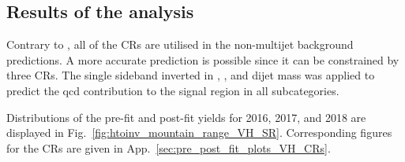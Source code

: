 

\subsection{Results of the \texorpdfstring{\VH}{VH} analysis}
\label{subsec:htoinv_analysis_VH}

Contrary to \ttH, all of the \glspl{CR} are utilised in the non-multijet background predictions. A more accurate \ztonunu prediction is possible since it can be constrained by three \glspl{CR}. The single sideband inverted in \mindphi, \omegaTilde, and dijet mass was applied to predict the \acrshort{qcd} contribution to the signal region in all \VH subcategories.

Distributions of the pre-fit and post-fit yields for 2016, 2017, and 2018 are displayed in Fig.~\ref{fig:htoinv_mountain_range_VH_SR}. Corresponding figures for the \glspl{CR} are given in App.~\ref{sec:pre_post_fit_plots_VH_CRs}.

